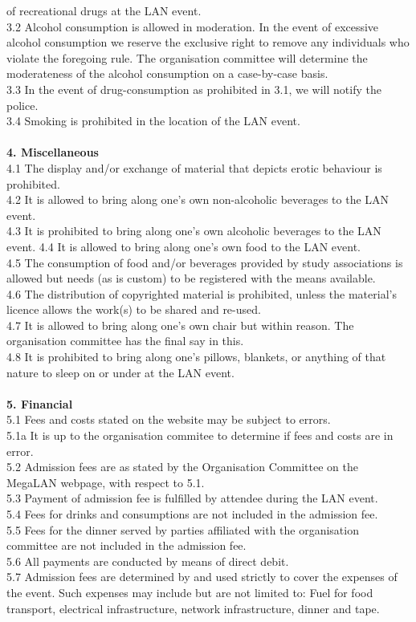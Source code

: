 \documentclass{article}
\begin{document}
of recreational drugs at the LAN event. \\
3.2 Alcohol consumption is allowed in moderation. In the event of excessive 
alcohol consumption we reserve the exclusive right to remove any individuals who 
violate the foregoing rule. The organisation committee will determine the 
moderateness of the alcohol consumption on a case-by-case basis. \\
3.3 In the event of drug-consumption as prohibited in 3.1, we will notify the 
police. \\
3.4 Smoking is prohibited in the location of the LAN event.\\
\\
\textbf{4. Miscellaneous}\\
4.1 The display and/or exchange of material that depicts erotic behaviour is 
prohibited. \\
4.2 It is allowed to bring along one’s own non-alcoholic beverages to the LAN event. \\
4.3 It is prohibited to bring along one’s own alcoholic beverages to the LAN event.
4.4 It is allowed to bring along one’s own food to the LAN event. \\
4.5 The consumption of food and/or beverages provided by study associations is allowed 
but needs (as is custom) to be registered with the means available.\\
4.6 The distribution of copyrighted material is prohibited, unless the 
material’s licence allows the work(s) to be shared and re-used. \\
4.7 It is allowed to bring along one’s own chair but within reason. The organisation
committee has the final say in this. \\
4.8 It is prohibited to bring along one’s pillows, blankets, or anything of that 
nature to sleep on or under at the LAN event. \\
\\
\textbf{5. Financial}\\
5.1 Fees and costs stated on the website may be subject to errors.\\
5.1a It is up to the organisation commitee to determine if fees and costs are
in error.\\
5.2 Admission fees are as stated by the Organisation Committee on the MegaLAN
webpage, with respect to 5.1.\\
5.3 Payment of admission fee is fulfilled by attendee during the LAN event.\\
5.4 Fees for drinks and consumptions are not included in the admission fee.\\
5.5 Fees for the dinner served by parties affiliated with the  organisation 
committee are not included in the admission fee.\\
5.6 All payments are conducted by means of direct debit. \\
5.7 Admission fees are determined by and used strictly to cover the expenses of 
the event. Such expenses may include but are not limited to: Fuel for food 
transport, electrical infrastructure, network infrastructure, dinner and tape.\\
\end{document}
